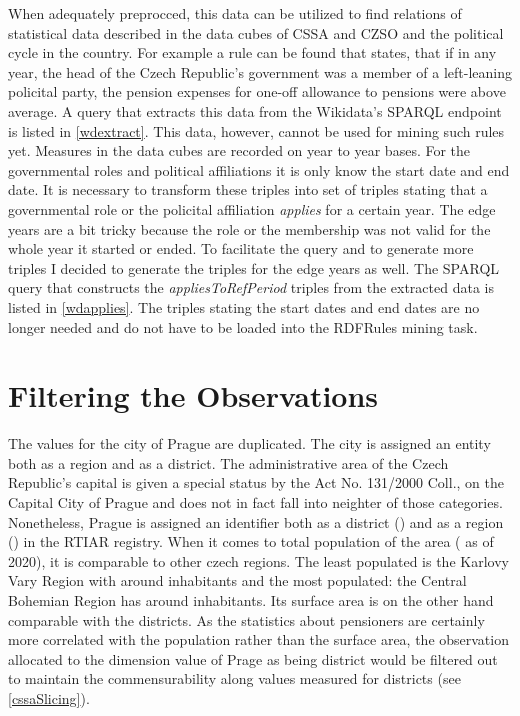 When adequately preprocced, this data can be utilized to find relations of statistical data described in the data cubes of CSSA and CZSO and the political cycle in the country. For example a rule can be found that states, that if in any year, the head of the Czech Republic's government was a member of a left-leaning policital party, the pension expenses for one-off allowance to pensions were above average. A query that extracts this data from the Wikidata's SPARQL endpoint is listed in \ref{wdextract}. This data, however, cannot be used for mining such rules yet. Measures in the data cubes are recorded on year to year bases. For the governmental roles and political affiliations it is only know the start date and end date. It is necessary to transform these triples into set of triples stating that a governmental role or the policital affiliation \textit{applies} for a certain year. The edge years are a bit tricky because the role or the membership was not valid for the whole year it started or ended. To facilitate the query and to generate more triples I decided to generate the triples for the edge years as well. The SPARQL query that constructs the \textit{appliesToRefPeriod} triples from the extracted data is listed in \ref{wdapplies}. The triples stating the start dates and end dates are no longer needed and do not have to be loaded into the RDFRules mining task.




\section{Filtering the Observations}

The values for the city of Prague are duplicated. The city is assigned an entity both as a region and as a district. The administrative area of the Czech Republic's capital is given a special status by the Act No. 131/2000 Coll., on the Capital City of Prague and does not in fact fall into neighter of those categories. Nonetheless, Prague is assigned an identifier both as a district () and as a region () in the RTIAR registry. When it comes to total population of the area ( as of 2020), it is comparable to other czech regions. The least populated is the Karlovy Vary Region with around  inhabitants and the most populated: the Central Bohemian Region has around  inhabitants. Its surface area is on the other hand comparable with the districts. As the statistics about pensioners are certainly more correlated with the population rather than the surface area, the observation allocated to the dimension value of Prage as being district would be filtered out to maintain the commensurability along values measured for districts (see \ref{cssaSlicing}).

